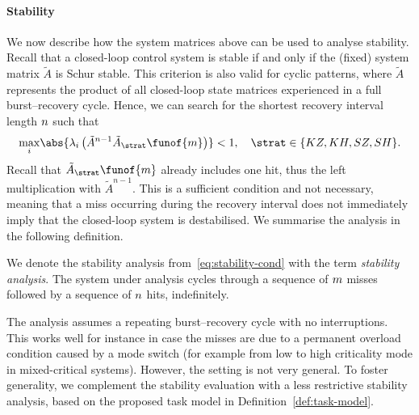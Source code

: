 \paragraph*{Stability}%

We now describe how the system matrices above can be used to analyse stability. 
Recall that a closed-loop control system is stable if and only if the (fixed) system matrix $\tilde A$ is Schur stable. 
This criterion is also valid for cyclic patterns, where $\tilde A$ represents the product of all closed-loop state matrices experienced in a full burst--recovery cycle. 
Hence, we can search for the shortest recovery interval length $n$ such that
%
\begin{equation}
\label{eq:stability-cond}
    \underset{i}{\max}{\abs{\eig{i}{\tilde A^{\numhits-1}\tilde A_{\strat}\funof{\nummisses}}}} < 1, \quad \strat \in  \{ KZ, KH, SZ, SH \}.
\end{equation}
%
Recall that $\tilde A_{\strat}\funof{m}$ already includes one hit, thus the left multiplication with $\tilde A^{n-1}$. 
This is a sufficient condition and not necessary, meaning that a miss occurring during the recovery interval does not immediately imply that the closed-loop system is destabilised. 
We summarise the analysis in the following definition.

\begin{definition}%
    We denote the stability analysis from~\eqref{eq:stability-cond} with the term \emph{\nilsstability{} stability analysis}.
    The system under analysis cycles through a sequence of $m$ misses followed by a sequence of $n$ hits, indefinitely.
\end{definition}
%
The \nilsstability{} analysis assumes a repeating burst--recovery cycle with no interruptions.
This works well for instance in case the misses are due to a permanent overload condition caused by a mode switch (for example from low to high criticality mode in mixed-critical systems).
However, the setting is not very general.
To foster generality, we complement the stability evaluation with a less restrictive stability analysis, based on the proposed task model in Definition~\ref{def:task-model}.

